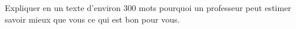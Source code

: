 
\begin{exercice}\label{exosmath-0446}

    Expliquer en un texte d'environ \( 300\) mots pourquoi un professeur peut estimer savoir mieux que vous ce qui est bon pour vous.

\end{exercice}
